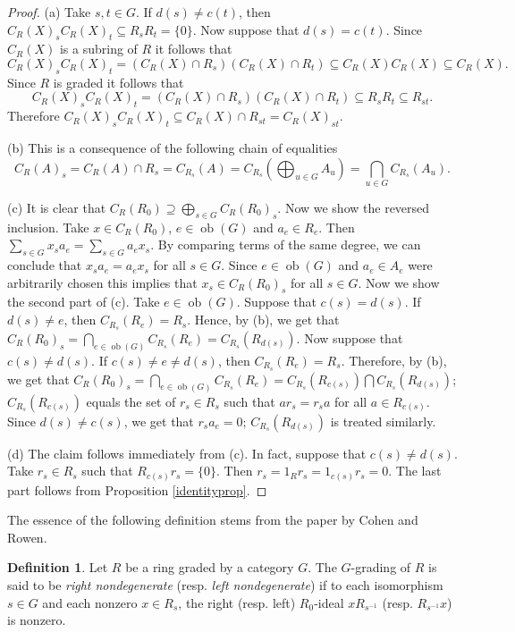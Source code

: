 \documentclass[11pt,leqno]{amsart}
\theoremstyle{plain}
\theoremstyle{definition}
\newtheorem{defn}{Definition}
\DeclareMathOperator{\ob}{ob}
\begin{document}
\begin{proof}
(a) Take $s,t \in G$. If $d(s) \neq c(t)$, then
$C_R(X)_s C_R(X)_t \subseteq R_s R_t = \{ 0 \}$.
Now suppose that $d(s) = c(t)$.
Since $C_R(X)$ is a subring of $R$
it follows that $$C_R(X)_s C_R(X)_t =
(C_R(X) \cap R_s)(C_R(X) \cap R_t) \subseteq
C_R(X)C_R(X) \subseteq C_R(X).$$
Since $R$ is graded it follows that
$$C_R(X)_s C_R(X)_t = (C_R(X) \cap R_s)(C_R(X) \cap R_t)
\subseteq R_s R_t \subseteq R_{st}.$$
Therefore $C_R(X)_s C_R(X)_t \subseteq
C_R(X) \cap R_{st} = C_R(X)_{st}$.

(b) This is a consequence of the following chain of equalities
$$C_R(A)_s = C_R(A) \cap R_s = C_{R_s}(A) = C_{R_s}\left(\bigoplus_{u \in G}
A_u\right) = \bigcap_{u \in G} C_{R_s}(A_u).$$

(c) It is clear that $C_R(R_0) \supseteq \bigoplus_{s \in G}
C_R(R_0)_s$. Now we show the reversed inclusion. Take $x \in
C_R(R_0)$, $e \in \ob(G)$ and $a_e \in R_e$. Then $\sum_{s \in G} x_s
a_e = \sum_{s \in G} a_e x_s$. By comparing terms of the same
degree, we can conclude that $x_s a_e = a_e x_s$ for all $s \in G$.
Since $e \in \ob(G)$ and $a_e \in A_e$ were arbitrarily chosen this
implies that $x_s \in C_R(R_0)_s$ for all $s \in G$. Now we show the
second part of (c). Take $e \in \ob(G)$. Suppose that $c(s)=d(s)$. If
$d(s) \neq e$, then $C_{R_s}(R_e) = R_s$.
Hence, by (b), we get that $C_R(R_0)_s = \bigcap_{e \in
\ob(G)}C_{R_s}(R_e) = C_{R_s}(R_{d(s)})$. Now suppose that $c(s) \neq
d(s)$. If $c(s) \neq e \neq d(s)$, then $C_{R_s}(R_e) = R_s$.
Therefore, by (b), we get that
$C_R(R_0)_s = \bigcap_{e \in \ob(G)}C_{R_s}(R_e) = C_{R_s}(R_{c(s)})
\bigcap C_{R_s}(R_{d(s)})$; $C_{R_s}(R_{c(s)})$ equals the set of
$r_s \in R_s$ such that $a r_s = r_s a$ for all $a \in R_{c(s)}$.
Since $d(s) \neq c(s)$, we get that $r_s a_e = 0$;
$C_{R_s}(R_{d(s)})$ is treated similarly.

(d) The claim follows immediately from (c). In fact, suppose that
$c(s) \neq d(s)$. Take $r_s \in R_s$ such that $R_{c(s)}r_s = \{ 0
\}$. Then $r_s = 1_R r_s = 1_{c(s)} r_s = 0$.
The last part follows from Proposition \ref{identityprop}.
\end{proof}

The essence of the following definition stems from 
the paper \cite{cohrow} by Cohen and Rowen.

\begin{defn}\label{defnonzeroidealproperty}
Let $R$ be a ring graded by a category $G$.
The $G$-grading of $R$ is said to be \emph{right nondegenerate} (resp.
\emph{left nondegenerate}) if to each isomorphism $s \in G$
and each nonzero $x \in R_s$, the
right (resp. left) $R_0$-ideal $x R_{s^{-1}}$ (resp. $R_{s^{-1}} x$) is nonzero.
\end{defn}
\end{document}
